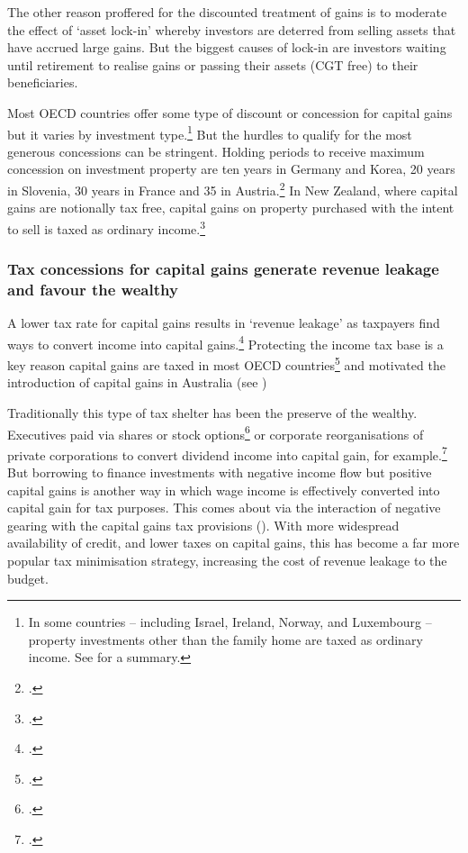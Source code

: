 \documentclass{grattan}\usepackage[]{graphicx}\usepackage[]{color}
\begin{document}
The other reason proffered for the discounted treatment of gains is to moderate the effect of `asset lock-in' whereby investors are deterred from selling assets that have accrued large gains. But the biggest causes of lock-in are investors waiting until retirement to realise gains or passing their assets (CGT free) to their beneficiaries. 

Most OECD countries offer some type of discount or concession for capital gains but it varies by investment type.\footnote{In some countries -- including Israel, Ireland, Norway, and Luxembourg -- property investments other than the family home are taxed as ordinary income. See \textcite{Harding2013} for a summary.}  But the hurdles to qualify for the most generous concessions can be stringent. Holding periods to receive maximum concession on investment property are ten years in Germany and Korea, 20 years in Slovenia, 30 years in France and 35 in Austria.\footcite{Harding2013} In New Zealand, where capital gains are notionally tax free, capital gains on property purchased with the intent to sell is taxed as ordinary income.\footcite[p.~25]{prebble2010tax} 
  
\subsubsection{Tax concessions for capital gains generate revenue leakage and favour the wealthy}
A lower tax rate for capital gains results in `revenue leakage' as taxpayers find ways to convert income into capital gains.\footcites{Evans2005}{Minas2013}  Protecting the income tax base is a key reason capital gains are taxed in most OECD countries\footcite{OECD2006b} and motivated the introduction of capital gains in Australia (see )

Traditionally this type of tax shelter has been the preserve of the wealthy. Executives paid via shares or stock options\footcite[pp.8-9]{Ingles2009} or corporate reorganisations of private corporations to convert dividend income into capital gain, for example.\footcite{Minas2013} But borrowing to finance investments with negative income flow but positive capital gains is another way in which wage income is effectively converted into capital gain for tax purposes. This comes about via the interaction of negative gearing with the capital gains tax provisions (). With more widespread availability of credit, and lower taxes on capital gains, this has become a far more popular tax minimisation strategy, increasing the cost of revenue leakage to the budget.
\end{document}
